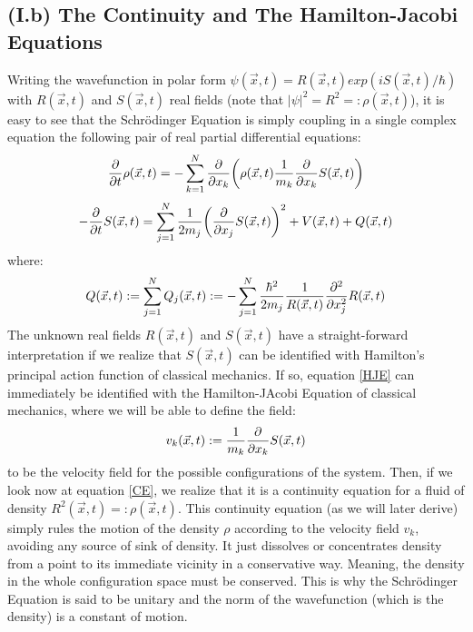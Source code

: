 \documentclass[11pt, a4paper]{article} %
\begin{document}
\subsection*{(I.b) The Continuity and The Hamilton-Jacobi Equations}
Writing the wavefunction in polar form $\psi(\vec{x},t)=R(\vec{x},t)exp(iS(\vec{x},t)/\hbar)$ with $R(\vec{x},t)$ and $S(\vec{x},t)$ real fields (note that $|\psi|^2=R^2=:\rho(\vec{x},t)$), it is easy to see that the Schrödinger Equation is simply coupling in a single complex equation the following pair of real partial differential equations:
\begin{equation}\label{CE}
\pdv{}{t} \rho(\vec{x},t)=-\sum_{k=1}^N \pdv{}{x_k}\qty( \rho(\vec{x},t)\frac{1}{m_k}\pdv{}{x_k} S(\vec{x},t) )
\end{equation}
\begin{equation}\label{HJE}
-\pdv{}{t}S(\vec{x},t) = \sum_{j=1}^N \frac{1}{2m_j} \qty(\pdv{}{x_j} S(\vec{x},t) )^2+ V(\vec{x},t)+Q(\vec{x},t)
\end{equation}
where:
\begin{equation}\label{QP}
Q(\vec{x},t):=\sum_{j=1}^N Q_j(\vec{x},t):=-\sum_{j=1}^N \frac{\hbar^2}{2m_j}\frac{1}{R(\vec{x},t)}\pdv[2]{}{x_j} R(\vec{x},t)
\end{equation}
The unknown real fields $R(\vec{x},t)$ and $S(\vec{x},t)$ have a straight-forward interpretation if we realize that $S(\vec{x},t)$ can be identified with Hamilton's principal action function of classical mechanics. If so, equation \eqref{HJE} can immediately be identified with the Hamilton-JAcobi Equation of classical mechanics, where we will be able to define the field:%
\begin{equation}
v_k(\vec{x},t):=\frac{1}{m_k}\pdv{}{x_k}S(\vec{x},t)
\end{equation}
to be the velocity field for the possible configurations of the system. Then, if we look now at equation \eqref{CE}, we realize that it is a continuity equation for a fluid of density $R^2(\vec{x},t)=:\rho(\vec{x},t)$. This continuity equation (as we will later derive) simply rules the motion of the density $\rho$ according to the velocity field $v_k$, avoiding any source of sink of density. It just dissolves or concentrates density from a point to its immediate vicinity in a conservative way. Meaning, the density in the whole configuration space must be conserved. This is why the Schrödinger Equation is said to be unitary and the norm of the wavefunction (which is the density) is a constant of motion.
\end{document}
